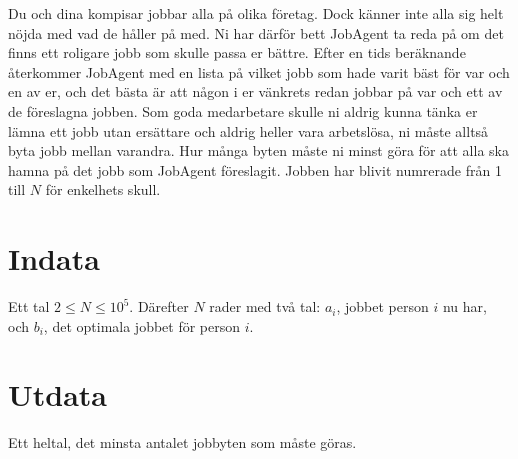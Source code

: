 Du och dina kompisar jobbar alla på olika företag. 
Dock känner inte alla sig helt nöjda med vad de håller på med. 
Ni har därför bett JobAgent ta reda på om det finns ett roligare jobb som skulle passa er bättre.
Efter en tids beräknande återkommer JobAgent med en lista på vilket jobb som hade varit bäst för var och en av er, och det bästa är att någon i er vänkrets redan jobbar på var och ett av de föreslagna jobben. 
Som goda medarbetare skulle ni aldrig kunna tänka er lämna ett jobb utan ersättare och aldrig heller vara arbetslösa, ni måste alltså byta jobb mellan varandra. 
Hur många byten måste ni minst göra för att alla ska hamna på det jobb som JobAgent föreslagit. Jobben har blivit numrerade från 1 till $N$ för enkelhets skull. 

\section*{Indata}
Ett tal $2 \leq N \leq 10^5$.
Därefter $N$ rader med två tal: $a_i$, jobbet person $i$ nu har, och $b_i$, det optimala jobbet för person $i$.

\section*{Utdata}
Ett heltal, det minsta antalet jobbyten som måste göras. 

